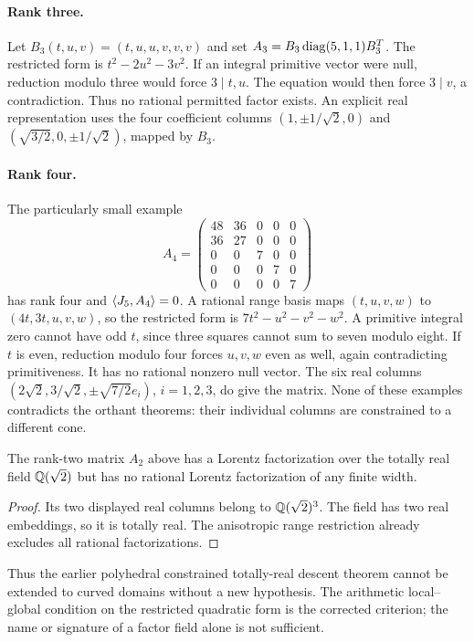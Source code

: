 \paragraph{Rank three.}
Let $B_3(t,u,v)=(t,u,u,v,v,v)$ and set $A_3=B_3\operatorname{diag}(5,1,1)B_3^T$. The restricted form is $t^2-2u^2-3v^2$. If an integral primitive vector were null, reduction modulo three would force $3\mid t,u$. The equation would then force $3\mid v$, a contradiction. Thus no rational permitted factor exists. An explicit real representation uses the four coefficient columns $(1,\pm1/\sqrt2,0)$ and $(\sqrt{3/2},0,\pm1/\sqrt2)$, mapped by $B_3$.

\paragraph{Rank four.}
The particularly small example
\[
 A_4=\begin{pmatrix}
48&36&0&0&0\\36&27&0&0&0\\
0&0&7&0&0\\0&0&0&7&0\\0&0&0&0&7
\end{pmatrix}
\tag{R4}\label{eq:r4}
\]
has rank four and $\langle J_5,A_4\rangle=0$. A rational range basis maps $(t,u,v,w)$ to $(4t,3t,u,v,w)$, so the restricted form is $7t^2-u^2-v^2-w^2$. A primitive integral zero cannot have odd $t$, since three squares cannot sum to seven modulo eight. If $t$ is even, reduction modulo four forces $u,v,w$ even as well, again contradicting primitiveness. It has no rational nonzero null vector. The six real columns $(2\sqrt2,3/\sqrt2,\pm\sqrt{7/2}e_i)$, $i=1,2,3$, do give the matrix. None of these examples contradicts the orthant theorems: their individual columns are constrained to a different cone.

\begin{corollary}
The rank-two matrix $A_2$ above has a Lorentz factorization over the totally real field $\mathbb Q(\sqrt2)$ but has no rational Lorentz factorization of any finite width.
\end{corollary}
\begin{proof}
Its two displayed real columns belong to $\mathbb Q(\sqrt2)^3$. The field has two real embeddings, so it is totally real. The anisotropic range restriction already excludes all rational factorizations.
\end{proof}
Thus the earlier polyhedral constrained totally-real descent theorem cannot be extended to curved domains without a new hypothesis. The arithmetic local--global condition on the restricted quadratic form is the corrected criterion; the name or signature of a factor field alone is not sufficient.

